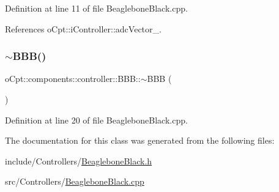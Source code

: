 Definition at line 11 of file Beaglebone\+Black.\+cpp.



References o\+Cpt\+::i\+Controller\+::adc\+Vector\+\_\+.

\hypertarget{classo_cpt_1_1components_1_1controller_1_1_b_b_b_acdf417541bfd66c55fba8a09e8cd09a1}{}\label{classo_cpt_1_1components_1_1controller_1_1_b_b_b_acdf417541bfd66c55fba8a09e8cd09a1} 
\subsubsection{\texorpdfstring{$\sim$\+B\+B\+B()}{~BBB()}}
{\footnotesize\ttfamily o\+Cpt\+::components\+::controller\+::\+B\+B\+B\+::$\sim$\+B\+BB (\begin{DoxyParamCaption}{ }\end{DoxyParamCaption})\hspace{0.3cm}{\ttfamily [virtual]}}



Definition at line 20 of file Beaglebone\+Black.\+cpp.



The documentation for this class was generated from the following files\+:\begin{DoxyCompactItemize}
\item 
include/\+Controllers/\hyperlink{_beaglebone_black_8h}{Beaglebone\+Black.\+h}\item 
src/\+Controllers/\hyperlink{_beaglebone_black_8cpp}{Beaglebone\+Black.\+cpp}\end{DoxyCompactItemize}
